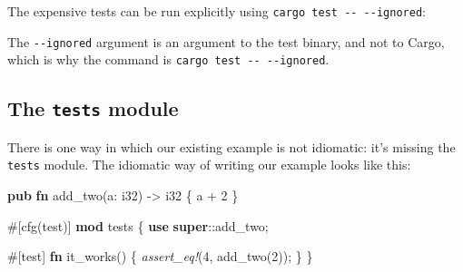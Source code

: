 \documentclass[a4paper,]{book}
\newenvironment{Shaded}{\begin{snugshade}}{\end{snugshade}}
\newcommand{\KeywordTok}[1]{\textcolor[rgb]{0.13,0.29,0.53}{\textbf{{#1}}}}
\newcommand{\DataTypeTok}[1]{\textcolor[rgb]{0.13,0.29,0.53}{{#1}}}
\newcommand{\DecValTok}[1]{\textcolor[rgb]{0.00,0.00,0.81}{{#1}}}
\newcommand{\PreprocessorTok}[1]{\textcolor[rgb]{0.56,0.35,0.01}{\textit{{#1}}}}
\newcommand{\AttributeTok}[1]{\textcolor[rgb]{0.77,0.63,0.00}{{#1}}}
\newcommand{\NormalTok}[1]{{#1}}
\begin{document}
The expensive tests can be run explicitly using
\texttt{cargo\ test\ -\/-\ -\/-ignored}:

\begin{Shaded}
\end{Shaded}

The \texttt{-\/-ignored} argument is an argument to the test binary, and
not to Cargo, which is why the command is
\texttt{cargo\ test\ -\/-\ -\/-ignored}.

\subsection{\texorpdfstring{The \texttt{tests}
module}{The tests module}}\label{the-tests-module}

There is one way in which our existing example is not idiomatic: it's
missing the \texttt{tests} module. The idiomatic way of writing our
example looks like this:

\begin{Shaded}
\begin{Highlighting}[]
\KeywordTok{pub} \KeywordTok{fn} \NormalTok{add_two(a: }\DataTypeTok{i32}\NormalTok{) -> }\DataTypeTok{i32} \NormalTok{\{}
    \NormalTok{a + }\DecValTok{2}
\NormalTok{\}}

\AttributeTok{#[}\NormalTok{cfg}\AttributeTok{(}\NormalTok{test}\AttributeTok{)]}
\KeywordTok{mod} \NormalTok{tests \{}
    \KeywordTok{use} \KeywordTok{super}\NormalTok{::add_two;}

    \AttributeTok{#[}\NormalTok{test}\AttributeTok{]}
    \KeywordTok{fn} \NormalTok{it_works() \{}
        \PreprocessorTok{assert_eq!}\NormalTok{(}\DecValTok{4}\NormalTok{, add_two(}\DecValTok{2}\NormalTok{));}
    \NormalTok{\}}
\NormalTok{\}}
\end{Highlighting}
\end{Shaded}
\end{document}
